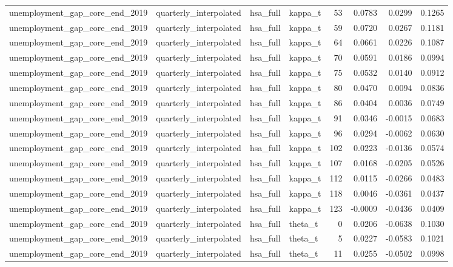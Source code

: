 \begin{tabular}{llllrrrr}
unemployment\_gap\_core\_end\_2019 & quarterly\_interpolated & hsa\_full & kappa\_t & 53 & 0.0783 & 0.0299 & 0.1265 \\
unemployment\_gap\_core\_end\_2019 & quarterly\_interpolated & hsa\_full & kappa\_t & 59 & 0.0720 & 0.0267 & 0.1181 \\
unemployment\_gap\_core\_end\_2019 & quarterly\_interpolated & hsa\_full & kappa\_t & 64 & 0.0661 & 0.0226 & 0.1087 \\
unemployment\_gap\_core\_end\_2019 & quarterly\_interpolated & hsa\_full & kappa\_t & 70 & 0.0591 & 0.0186 & 0.0994 \\
unemployment\_gap\_core\_end\_2019 & quarterly\_interpolated & hsa\_full & kappa\_t & 75 & 0.0532 & 0.0140 & 0.0912 \\
unemployment\_gap\_core\_end\_2019 & quarterly\_interpolated & hsa\_full & kappa\_t & 80 & 0.0470 & 0.0094 & 0.0836 \\
unemployment\_gap\_core\_end\_2019 & quarterly\_interpolated & hsa\_full & kappa\_t & 86 & 0.0404 & 0.0036 & 0.0749 \\
unemployment\_gap\_core\_end\_2019 & quarterly\_interpolated & hsa\_full & kappa\_t & 91 & 0.0346 & -0.0015 & 0.0683 \\
unemployment\_gap\_core\_end\_2019 & quarterly\_interpolated & hsa\_full & kappa\_t & 96 & 0.0294 & -0.0062 & 0.0630 \\
unemployment\_gap\_core\_end\_2019 & quarterly\_interpolated & hsa\_full & kappa\_t & 102 & 0.0223 & -0.0136 & 0.0574 \\
unemployment\_gap\_core\_end\_2019 & quarterly\_interpolated & hsa\_full & kappa\_t & 107 & 0.0168 & -0.0205 & 0.0526 \\
unemployment\_gap\_core\_end\_2019 & quarterly\_interpolated & hsa\_full & kappa\_t & 112 & 0.0115 & -0.0266 & 0.0483 \\
unemployment\_gap\_core\_end\_2019 & quarterly\_interpolated & hsa\_full & kappa\_t & 118 & 0.0046 & -0.0361 & 0.0437 \\
unemployment\_gap\_core\_end\_2019 & quarterly\_interpolated & hsa\_full & kappa\_t & 123 & -0.0009 & -0.0436 & 0.0409 \\
unemployment\_gap\_core\_end\_2019 & quarterly\_interpolated & hsa\_full & theta\_t & 0 & 0.0206 & -0.0638 & 0.1030 \\
unemployment\_gap\_core\_end\_2019 & quarterly\_interpolated & hsa\_full & theta\_t & 5 & 0.0227 & -0.0583 & 0.1021 \\
unemployment\_gap\_core\_end\_2019 & quarterly\_interpolated & hsa\_full & theta\_t & 11 & 0.0255 & -0.0502 & 0.0998 \\

\end{tabular}
